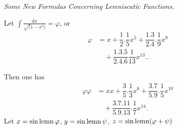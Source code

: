 \begingroup
\renewcommand{\arraystretch}{1.45}
\clearpage{}
\par{}\begin{center}\textit{Some New Formulas Concerning Lemniscatic Functions.}\end{center}
Let $\displaystyle\int\frac{\mathrm{d}x}{\surd(1-x^4)}=\varphi$, or
\[
\begin{aligned}\varphi&=x+\dfrac12.\dfrac15x^5+\dfrac{1.3}{2.4}.\dfrac19x^9\\[6pt]&\quad{}+\dfrac{1.3.5}{2.4.6}\dfrac1{13}x^{13}\mathord{.}\mathord{.}\end{aligned}
\]

Then one has
\[
\begin{aligned}\varphi\varphi&=xx+\dfrac35.\dfrac13x^6+\dfrac{3.7}{5.9}.\dfrac15x^{10}\\[6pt]&\quad{}+\dfrac{3.7.11}{5.9.13}.\dfrac17x^{14}.\end{aligned}
\]
Let $x=\operatorname{sin\,lemn}\varphi$, $y=\operatorname{sin\,lemn}\psi$, $z=\operatorname{sin\,lemn}(\varphi+\psi)$

